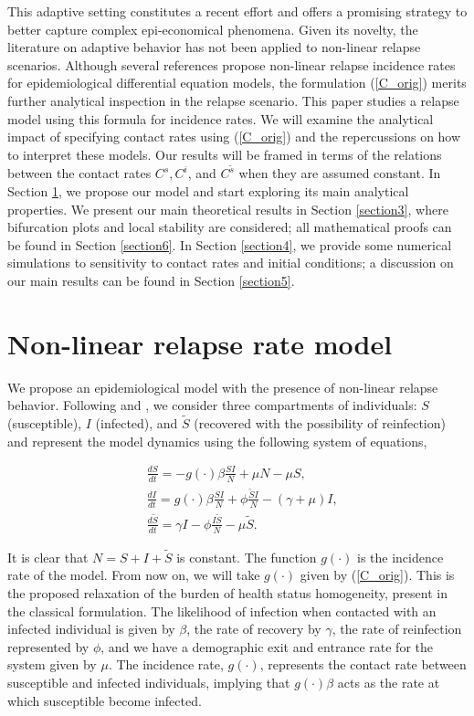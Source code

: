 \documentclass[sn-basic]{sn-jnl}%
\theoremstyle{thmstyleone}%
\theoremstyle{thmstyletwo}%
\theoremstyle{thmstylethree}%
\newcommand{\wS}{\widetilde{S}}
\newcommand{\ws}{\widetilde{s}}
\begin{document}
This adaptive setting constitutes a recent effort and offers a promising strategy to better capture complex epi-economical phenomena. Given its novelty, the literature on adaptive behavior has not been applied to non-linear relapse scenarios. Although several references propose non-linear relapse incidence rates for epidemiological differential equation models, the formulation (\ref{C_orig}) merits further analytical inspection in the relapse scenario. This paper studies a relapse model using this formula for incidence rates. We will examine the analytical impact of specifying contact rates using (\ref{C_orig}) and the repercussions on how to interpret these models. Our results will be framed in terms of the relations between the contact rates $C^s, C^i$, and $C^{\ws}$ when they are assumed constant. In Section \ref{section2}, we propose our model and start exploring its main analytical properties. We present our main theoretical results in Section \ref{section3}, where bifurcation plots and local stability are considered; all mathematical proofs can be found in Section \ref{section6}. In Section \ref{section4}, we provide some numerical simulations to sensitivity to contact rates and initial conditions; a discussion on our main results can be found in Section \ref{section5}.

\section{Non-linear relapse rate model}\label{section2}

We propose an epidemiological model with the presence of non-linear relapse behavior. Following \cite{Schz19} and \cite{Snchz07}, we consider three compartments of individuals: $S$ (susceptible), $I$ (infected), and $\wS$ (recovered with the possibility of reinfection) and represent the model dynamics using the following system of equations,

\begin{align}\label{model1}
    & \frac{dS}{dt}=  -g(\cdot)\beta \frac{SI}{N} + \mu N - \mu S, \nonumber\\
    & \frac{dI}{dt}= g(\cdot)\beta \frac{SI}{N} + \phi\frac{\wS I}{N}-(\gamma+\mu)I,  \\
    & \frac{d\wS}{dt}= \gamma I - \phi \frac{I\wS}{N} - \mu \wS.\nonumber
\end{align}

It is clear that $N = S + I + \wS$ is constant. The function $g(\cdot)$ is the incidence rate of the model. From now on, we will take $g(\cdot)$ given by (\ref{C_orig}). This is the proposed relaxation of the burden of health status homogeneity, present in the classical formulation. The likelihood of infection when contacted with an infected individual is given by $\beta$, the rate of recovery by $\gamma$, the rate of reinfection represented by $\phi$, and we have a demographic exit and entrance rate for the system given by $\mu$. The incidence rate, $g(\cdot)$, represents the contact rate between susceptible and infected individuals, implying that $g(\cdot)\beta$ acts as the rate at which susceptible become infected.
\end{document}
